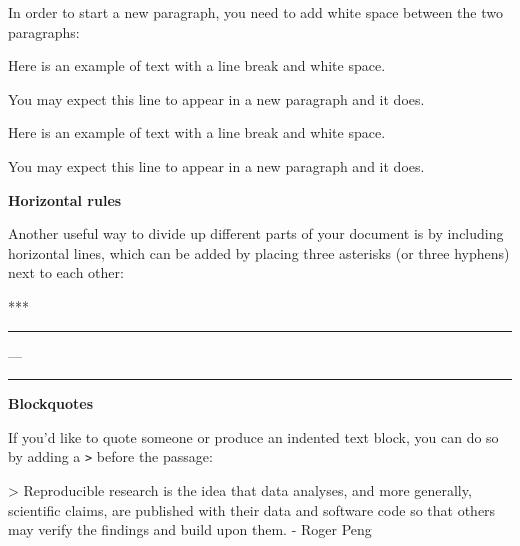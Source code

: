 \documentclass[]{tufte-book}
\newenvironment{Shaded}{\begin{snugshade}}{\end{snugshade}}
\newcommand{\DataTypeTok}[1]{\textcolor[rgb]{0.13,0.29,0.53}{#1}}
\newcommand{\NormalTok}[1]{#1}
\begin{document}
In order to start a new paragraph, you need to add white space between the two paragraphs:

\begin{Shaded}
\begin{Highlighting}[]
\NormalTok{Here is an example of text with a line break and white space.}

\NormalTok{You may expect this line to appear in a new paragraph and it does.}
\end{Highlighting}
\end{Shaded}

Here is an example of text with a line break and white space.

You may expect this line to appear in a new paragraph and it does.

\textbf{Horizontal rules}

Another useful way to divide up different parts of your document is by including horizontal lines, which can be added by placing three asterisks (or three hyphens) next to each other:

\begin{Shaded}
\begin{Highlighting}[]
\NormalTok{***}
\end{Highlighting}
\end{Shaded}

\begin{center}\rule{0.5\linewidth}{\linethickness}\end{center}

\begin{Shaded}
\begin{Highlighting}[]
\NormalTok{---}
\end{Highlighting}
\end{Shaded}

\begin{center}\rule{0.5\linewidth}{\linethickness}\end{center}

\textbf{Blockquotes}

If you'd like to quote someone or produce an indented text block, you can do so by adding a \texttt{\textgreater{}} before the passage:

\begin{Shaded}
\begin{Highlighting}[]
\NormalTok{>}\DataTypeTok{ Reproducible research is the idea that data analyses, and more generally,}
\DataTypeTok{scientific claims, are published with their data and software code so that}
\DataTypeTok{others may verify the findings and build upon them. - Roger Peng}
\end{Highlighting}
\end{Shaded}
\end{document}

